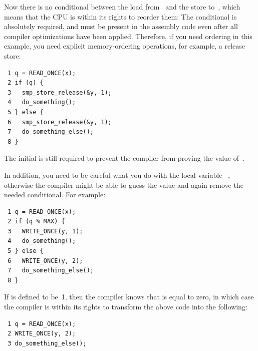 Now there is no conditional between the load from~ and the store
to~, which means that the CPU is within its rights to reorder them:
The conditional is absolutely required, and must be present in the
assembly code even after all compiler optimizations have been applied.
Therefore, if you need ordering in this example, you need explicit
memory-ordering operations, for example, a release store:

\vspace{5pt}
\begin{minipage}[t]{\columnwidth}
\scriptsize
\begin{verbatim}
 1 q = READ_ONCE(x);
 2 if (q) {
 3   smp_store_release(&y, 1);
 4   do_something();
 5 } else {
 6   smp_store_release(&y, 1);
 7   do_something_else();
 8 }
\end{verbatim}
\end{minipage}
\vspace{5pt}

The initial  is still required to prevent the compiler from
proving the value of~.

In addition, you need to be careful what you do with the local variable~%
,
otherwise the compiler might be able to guess the value and again remove
the needed conditional.
For example:

\vspace{5pt}
\begin{minipage}[t]{\columnwidth}
\scriptsize
\begin{verbatim}
 1 q = READ_ONCE(x);
 2 if (q % MAX) {
 3   WRITE_ONCE(y, 1);
 4   do_something();
 5 } else {
 6   WRITE_ONCE(y, 2);
 7   do_something_else();
 8 }
\end{verbatim}
\end{minipage}
\vspace{5pt}

If  is defined to be~1, then the compiler knows that  is
equal to zero, in which case the compiler is within its rights to
transform the above code into the following:

\vspace{5pt}
\begin{minipage}[t]{\columnwidth}
\scriptsize
\begin{verbatim}
 1 q = READ_ONCE(x);
 2 WRITE_ONCE(y, 2);
 3 do_something_else();
\end{verbatim}
\end{minipage}
\vspace{5pt}

